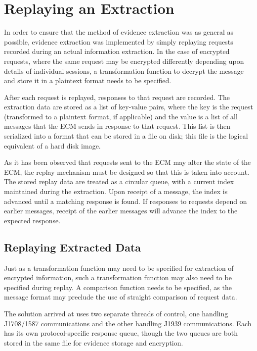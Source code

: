 \section{Replaying an Extraction}

In order to ensure that the method of evidence extraction was as general as possible, evidence extraction was implemented
by simply replaying requests recorded during an actual information extraction. In the case of encrypted requests, where
the same request may be encrypted differently depending upon details of individual sessions, a transformation function
to decrypt the message and store it in a plaintext format needs to be specified.

After each request is replayed, responses to that request are recorded. The extraction data are stored as a list of 
key-value pairs, where the key is the request (transformed to a plaintext format, if applicable) and the value is
a list of all messages that the ECM sends in response to that request. This list is then serialized into a format
that can be stored in a file on disk; this file is the logical equivalent of a hard disk image.

As it has been observed that requests sent to the ECM may alter the state of the ECM, the replay mechanism must
be designed so that this is taken into account. The stored replay data are treated as a circular queue, with a current
index maintained during the extraction. Upon receipt of a message, the index is advanced until a matching response is found.
If responses to requests depend on earlier messages, receipt of the earlier messages will advance the index to
the expected response.

\subsection{Replaying Extracted Data}

Just as a transformation function may need to be specified for extraction of encrypted information, such a transformation
function may also need to be specified during replay. A comparison function needs to be specified, as the message format may
preclude the use of straight comparison of request data.

The solution arrived at uses two separate threads of control, one handling J1708/1587 communications and the other
handling J1939 communications. Each has its own protocol-specific response queue, though the two queues are both
stored in the same file for evidence storage and encryption.



